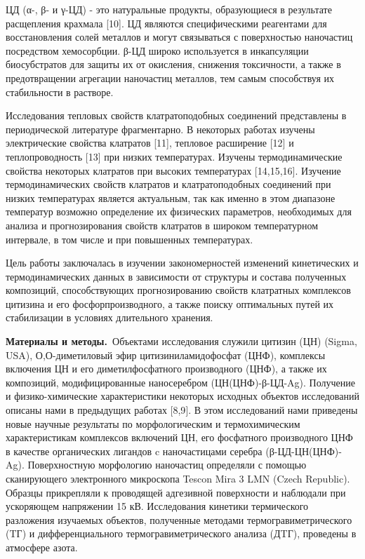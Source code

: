 \begin{multicols}{2}
ЦД (α-, β- и γ-ЦД) - это натуральные продукты, образующиеся в результате
расщепления крахмала {[}10{]}. ЦД являются специфическими реагентами для
восстановления солей металлов и могут связываться с поверхностью
наночастиц посредством хемосорбции. β-ЦД широко используется в
инкапсуляции биосубстратов для защиты их от окисления, снижения
токсичности, а также в предотвращении агрегации наночастиц металлов, тем
самым способствуя их стабильности в растворе.

Исследования тепловых свойств клатратоподобных соединений представлены в
периодической литературе фрагментарно. В некоторых работах изучены
электрические свойства клатратов {[}11{]}, тепловое расширение {[}12{]}
и теплопроводность {[}13{]} при низких температурах. Изучены
термодинамические свойства некоторых клатратов при высоких температурах
{[}14,15,16{]}. Изучение термодинамических свойств клатратов и
клатратоподобных соединений при низких температурах является актуальным,
так как именно в этом диапазоне температур возможно определение их
физических параметров, необходимых для анализа и прогнозирования свойств
клатратов в широком температурном интервале, в том числе и при
повышенных температурах.

Цель работы заключалась в изучении закономерностей изменений
кинетических и термодинамических данных в зависимости от структуры и
состава полученных композиций, способствующих прогнозированию свойств
клатратных комплексов цитизина и его фосфорпроизводного, а также поиску
оптимальных путей их стабилизации в условиях длительного хранения.

{\bfseries Материалы и методы.}~Объектами исследования служили цитизин (ЦН)
(Sigma, USA), О,О-диметиловый эфир цитизиниламидофосфат (ЦНФ), комплексы
включения ЦН и его диметилфосфатного производного (ЦНФ), а также их
композиций, модифицированные наносеребром (ЦН(ЦНФ)-β-ЦД-Ag). Получение и
физико-химические характеристики некоторых исходных объектов
исследований описаны нами в предыдущих работах {[}8,9{]}. В этом
исследований нами приведены новые научные результаты по морфологическим
и термохимическим характеристикам комплексов включений ЦН, его
фосфатного производного ЦНФ в качестве органических лигандов c
наночастицами серебра (β-ЦД-ЦН(ЦНФ)-Ag). Поверхностную морфологию
наночастиц определяли с помощью сканирующего электронного микроскопа
Tescon Mira 3 LMN (Czech Republic). Образцы прикрепляли к проводящей
адгезивной поверхности и наблюдали при ускоряющем напряжении 15 кВ.
Исследования кинетики термического разложения изучаемых объектов,
полученные методами термогравиметрического (TГ) и дифференциального
термогравиметрического анализа (ДTГ), проведены в атмосфере азота.


\end{multicols}
